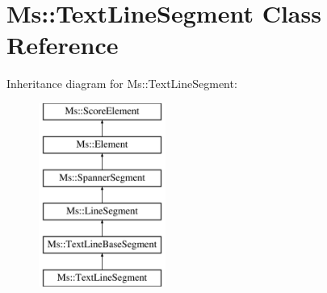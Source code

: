 \hypertarget{class_ms_1_1_text_line_segment}{}\section{Ms\+:\+:Text\+Line\+Segment Class Reference}
\label{class_ms_1_1_text_line_segment}
Inheritance diagram for Ms\+:\+:Text\+Line\+Segment\+:\begin{figure}[H]
\begin{center}
\leavevmode
\includegraphics[height=6.000000cm]{class_ms_1_1_text_line_segment}
\end{center}
\end{figure}
